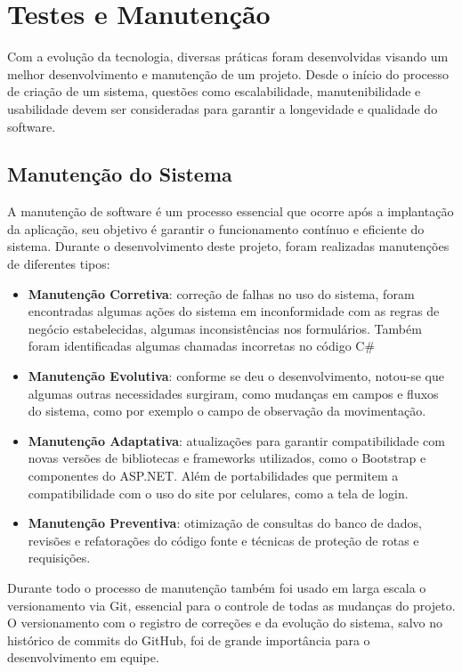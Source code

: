 \documentclass[
	12pt,				%
	openany,			%
	twoside,			%
	a4paper,			%
	english,			%
	brazil				%
	]{abntex2}
\begin{document}
\section{Testes e Manutenção}
Com a evolução da tecnologia, diversas práticas foram desenvolvidas visando um melhor desenvolvimento e manutenção de um projeto. Desde o início do processo de criação de um sistema, questões como escalabilidade, manutenibilidade e usabilidade devem ser consideradas para garantir a longevidade e qualidade do software.

\subsection{Manutenção do Sistema}

A manutenção de software é um processo essencial que ocorre após a implantação da aplicação, seu objetivo é garantir o funcionamento contínuo e eficiente do sistema. Durante o desenvolvimento deste projeto, foram realizadas manutenções de diferentes tipos:

\begin{itemize}
    \item \textbf{Manutenção Corretiva}: correção de falhas no uso do sistema, foram encontradas algumas ações do sistema em inconformidade com as regras de negócio estabelecidas, algumas inconsistências nos formulários. Também foram identificadas algumas chamadas incorretas no código C\#  
    \item \textbf{Manutenção Evolutiva}: conforme se deu o desenvolvimento, notou-se que algumas outras necessidades surgiram, como mudanças em campos e fluxos do sistema, como por exemplo o campo de observação da movimentação.
    \item \textbf{Manutenção Adaptativa}: atualizações para garantir compatibilidade com novas versões de bibliotecas e frameworks utilizados, como o Bootstrap e componentes do ASP.NET. Além de portabilidades que permitem a compatibilidade com o uso do site por celulares, como a tela de login.
    \item \textbf{Manutenção Preventiva}: otimização de consultas do banco de dados, revisões e refatorações do código fonte e técnicas de proteção de rotas e requisições.
\end{itemize}

Durante todo o processo de manutenção também foi usado em larga escala o versionamento via Git, essencial para o controle de todas as mudanças do projeto. O versionamento com o registro de correções e da evolução do sistema, salvo no histórico de commits do GitHub, foi de grande importância para o desenvolvimento em equipe.
\end{document}
